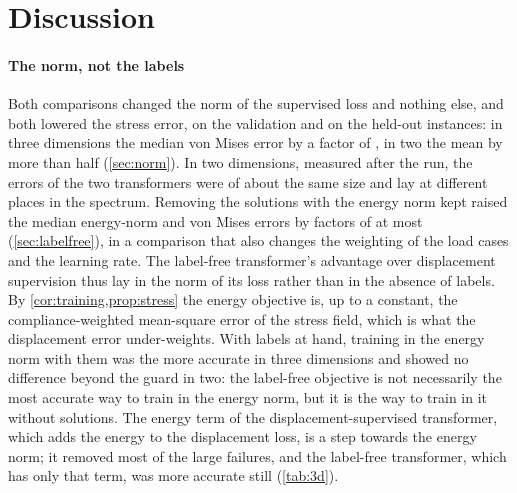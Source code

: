 \section{Discussion}\label{sec:discussion}

\paragraph{The norm, not the labels}
Both comparisons changed the norm of the supervised loss and nothing else, and both lowered
the stress error, on the validation and on the held-out instances: in three dimensions the
median von Mises error by a factor of \numNlThreeNormVm{}, in two the mean by more than half
(\cref{sec:norm}). In two dimensions, measured after the run, the errors of the two
transformers were of about the same size and lay at different places in the spectrum.
Removing the solutions with the energy norm kept raised the median energy-norm and von Mises
errors by factors of at most \numNlThreeLabelWithin{} (\cref{sec:labelfree}), in a comparison
that also changes the weighting of the load cases and the learning rate. The label-free
transformer's advantage over displacement supervision thus lay in the norm of its loss rather
than in the absence of labels. By \cref{cor:training,prop:stress} the energy objective is, up
to a constant, the compliance-weighted mean-square error of the stress field, which is what
the displacement error under-weights. With labels at hand, training in the energy norm with
them was the more accurate in three dimensions and showed no difference beyond the guard in
two: the label-free objective is not necessarily the most accurate way to train in the
energy norm, but it is the way to train in it without solutions. The energy term of the
displacement-supervised transformer, which adds the energy to the displacement loss, is a
step towards the energy norm; it removed most of the large failures, and the label-free
transformer, which has only that term, was more accurate still (\cref{tab:3d}).


